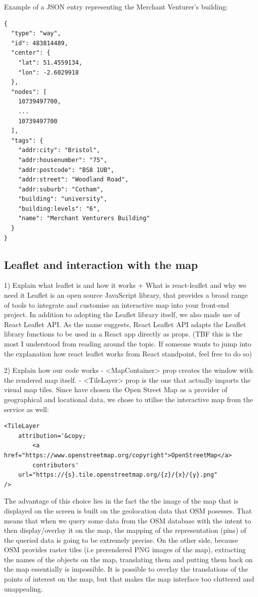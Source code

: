 Example of a JSON entry representing the Merchant Venturer's building:
\begin{verbatim} 
{
  "type": "way",
  "id": 483814489,
  "center": {
    "lat": 51.4559134,
    "lon": -2.6029918
  },
  "nodes": [
    10739497700,
    ...
    10739497700
  ],
  "tags": {
    "addr:city": "Bristol",
    "addr:housenumber": "75",
    "addr:postcode": "BS8 1UB",
    "addr:street": "Woodland Road",
    "addr:suburb": "Cotham",
    "building": "university",
    "building:levels": "6",
    "name": "Merchant Venturers Building"
  }
}
\end{verbatim}

\subsection{Leaflet and interaction with the map}
1) Explain what leaflet is and how it works +  What is react-leaflet and why we need it
Leaflet is an open source JavaScript library, that provides a broad range of tools to integrate and customise an interactive map into your front-end project. In addition to adopting the Leaflet library itself, we also made use of React Leaflet API. As the name suggests, React Leaflet API adapts the Leaflet library functions to be used in a React app directly as props. (TBF this is the most I understood from reading around the topic. If someone wants to jump into the explanation how react leaflet works from React standpoint, feel free to do so)

2) Explain how our code works
- <MapContainer> prop creates the window with the rendered map itself.
- <TileLayer> prop is the one that actually imports the visual map tiles. Since have chosen the Open Street Map as a provider of geographical and locational data, we chose to utilise the interactive map from the service as well:
\begin{verbatim}
<TileLayer
    attribution='&copy; 
        <a href="https://www.openstreetmap.org/copyright">OpenStreetMap</a> 
        contributors'
    url="https://{s}.tile.openstreetmap.org/{z}/{x}/{y}.png"
/>
\end{verbatim}
The advantage of this choice lies in the fact the the image of the map that is displayed on the screen is built on the geolocation data that OSM posesses. That means that when we query some data from the OSM database with the intent to then display/overlay it on the map, the mapping of the representation (pins) of the queried data is going to be extremely precise. On the other side, because OSM provides raster tiles (i.e prerendered PNG images of the map), extracting the names of the objects on the map, translating them and putting them back on the map essentially is impossible. It is possible to overlay the translations of the points of interest on the map, but that makes the map interface too cluttered and unappealing.

